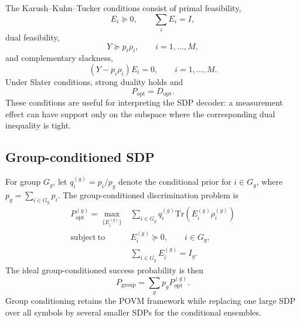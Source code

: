 The Karush--Kuhn--Tucker conditions consist of primal feasibility,
\begin{equation}
    E_i\succeq0,\qquad \sum_iE_i=I,
\end{equation}
dual feasibility,
\begin{equation}
    Y\succeq p_i\rho_i,\qquad i=1,\ldots,M,
\end{equation}
and complementary slackness,
\begin{equation}
    (Y-p_i\rho_i)E_i=0,\qquad i=1,\ldots,M.
\end{equation}
Under Slater conditions, strong duality holds and
\begin{equation}
    P_{\mathrm{opt}}=D_{\mathrm{opt}}.
\end{equation}
These conditions are useful for interpreting the SDP decoder: a measurement effect can have support only on the subspace where the corresponding dual inequality is tight.

\subsection*{Group-conditioned SDP}

For group $G_g$, let $q_i^{(g)}=p_i/p_g$ denote the conditional prior for $i\in G_g$, where $p_g=\sum_{i\in G_g}p_i$. The group-conditioned discrimination problem is
\begin{align}
    P_{\mathrm{opt}}^{(g)}
    =
    \max_{\{E_i^{(g)}\}}
    &\sum_{i\in G_g}q_i^{(g)}
    \mathrm{Tr}\left(E_i^{(g)}\rho_i^{(g)}\right)
    \label{eq:appendix_group_sdp}\\
    \mathrm{subject\ to}\quad
    &E_i^{(g)}\succeq0,\qquad i\in G_g,\nonumber\\
    &\sum_{i\in G_g}E_i^{(g)}=I_g.\nonumber
\end{align}
The ideal group-conditioned success probability is then
\begin{equation}
    P_{\mathrm{group}}=\sum_gp_gP_{\mathrm{opt}}^{(g)}.
\end{equation}
Group conditioning retains the POVM framework while replacing one large SDP over all symbols by several smaller SDPs for the conditional ensembles.

\FloatBarrier
